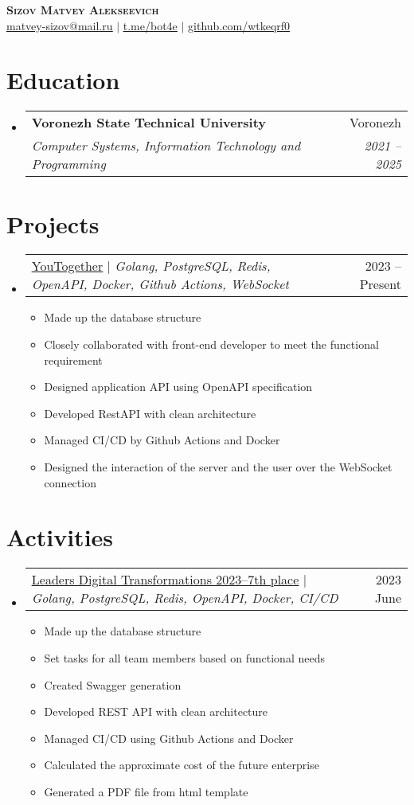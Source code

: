 \documentclass[letterpaper,11pt]{article}
\makeatletter
\newcommand{\resumeItem}[1]{
  \item\small{
    {#1 \vspace{-2pt}}
  }
}
\newcommand{\resumeSubheading}[4]{
  \vspace{-2pt}\item
    \begin{tabular*}{0.97\textwidth}[t]{l@{\extracolsep{\fill}}r}
      \textbf{#1} & #2 \\
      \textit{\small#3} & \textit{\small #4} \\
    \end{tabular*}\vspace{-7pt}
}
\newcommand{\resumeProjectHeading}[2]{
    \item
    \begin{tabular*}{0.97\textwidth}{l@{\extracolsep{\fill}}r}
      \small#1 & #2 \\
    \end{tabular*}\vspace{-7pt}
}
\newcommand{\resumeSubHeadingListStart}{\begin{itemize}[leftmargin=0.15in, label={}]}
\newcommand{\resumeSubHeadingListEnd}{\end{itemize}}
\newcommand{\resumeItemListStart}{\begin{itemize}}
\newcommand{\resumeItemListEnd}{\end{itemize}\vspace{-5pt}}
\makeatother
\begin{document}

\begin{center}
	\textbf{\Huge \scshape Sizov Matvey Alekseevich} \\ \vspace{1pt}
	\href{mailto:matvey-sizov@mail.ru}{\underline{matvey-sizov@mail.ru}} $|$ 
	\href{https://t.me/bot4e}{\underline{t.me/bot4e}} $|$
	\href{https://github.com/wtkeqrf0}{\underline{github.com/wtkeqrf0}}
\end{center}


\section{Education}
\resumeSubHeadingListStart
\resumeSubheading
{Voronezh State Technical University}{Voronezh}
{Computer Systems, Information Technology and Programming}{2021 -- 2025}
\resumeSubHeadingListEnd

\section{Projects}
\resumeSubHeadingListStart
\resumeProjectHeading
{\href{https://github.com/youtogether-online}{\underline{YouTogether}} $|$ \emph{Golang, PostgreSQL, Redis, OpenAPI, Docker, Github Actions, WebSocket}}{2023 -- Present}
\resumeItemListStart
\resumeItem{Made up the database structure}
\resumeItem{Closely collaborated with front-end developer to meet the functional requirement}
\resumeItem{Designed application API using OpenAPI specification}
\resumeItem{Developed RestAPI with clean architecture}
\resumeItem{Managed CI/CD by Github Actions and Docker}
\resumeItem{Designed the interaction of the server and the user over the WebSocket connection}
\resumeItemListEnd
\resumeSubHeadingListEnd

\section{Activities}
\resumeSubHeadingListStart
\resumeProjectHeading
{\href{https://github.com/wtkeqrf0/CV/blob/main/Leaders_Digital_Transformations_2023.pdf}{\underline{Leaders Digital Transformations 2023--7th place}} $|$ \emph{Golang, PostgreSQL, Redis, OpenAPI, Docker, CI/CD}}{2023 June}
\resumeItemListStart
\resumeItem{Made up the database structure}
\resumeItem{Set tasks for all team members based on functional needs}
\resumeItem{Created Swagger generation}
\resumeItem{Developed REST API with clean architecture}
\resumeItem{Managed CI/CD using Github Actions and Docker}
\resumeItem{Calculated the approximate cost of the future enterprise}
\resumeItem{Generated a PDF file from html template}
\resumeItemListEnd
\resumeSubHeadingListEnd
\end{document}
